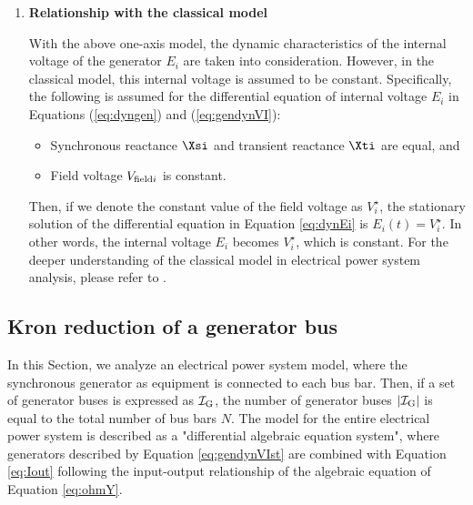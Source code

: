\documentclass[graybox, envcountchap]{svmult}
\begin{document}
\begin{enumerate}[label=\textbf{(\arabic*)}]
  \bigskip
  \item \textbf{Relationship with the classical model}
  
  With the above one-axis model, the dynamic characteristics of the internal
  voltage of the generator $E_i$ are taken into consideration. However, in the
  classical model, this internal voltage is assumed to be constant.
  Specifically, the following is assumed for the differential equation of
  internal voltage $E_i$ in Equations (\ref{eq:dyngen}) and (\ref{eq:gendynVI}):

  \begin{itemize}
    \item Synchronous reactance $\Xsi$ and transient reactance $\Xti$ are equal, and
    \item Field voltage $V_{{\rm field}i}$ is constant.
  \end{itemize}

  Then, if we denote the constant value of the field voltage as $V_i^{\star}$,
  the stationary solution of the differential equation in Equation
  \ref{eq:dynEi} is $E_i(t)=V_i^{\star}$. In other words, the internal
  voltage $E_i$ becomes $V_i^{\star}$, which is constant. For the deeper
  understanding of the classical model in electrical power system analysis,
  please refer to \cite[Section 2.11]{anderson2008power}.
\end{enumerate}

\subsection{Kron reduction of a generator bus}\label{sec:allgen}

In this Section, we analyze an electrical power system model, where the
synchronous generator as equipment is connected to each bus bar. Then, if a set
of generator buses is expressed as $\mathcal{I}_{\rm G}$, the number of
generator buses $|\mathcal{I}_{\rm G}|$ is equal to the total number of bus bars
$N$. The model for the entire electrical power system is described as a
"differential algebraic equation system", where generators described by Equation
\ref{eq:gendynVIst} are combined with Equation \ref{eq:Iout} following the
input-output relationship of the algebraic equation of Equation \ref{eq:ohmY}.
 
\end{document}
